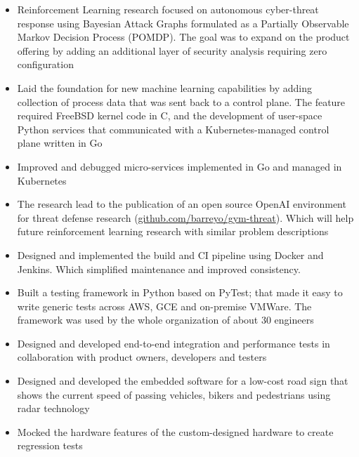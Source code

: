 \documentclass{cv_doc}
\begin{document}
\begin{itemize}[label={\tiny\raisebox{1ex}{\textbullet}}]
  \item {Reinforcement Learning research focused on autonomous cyber-threat response using Bayesian Attack Graphs formulated as a Partially Observable Markov Decision Process (POMDP). The goal was to expand on the product offering by adding an additional layer of security analysis requiring zero configuration}
  \item {Laid the foundation for new machine learning capabilities by adding collection of process data that was sent back to a control plane. The feature required FreeBSD kernel code in C, and the development of user-space Python services that communicated with a Kubernetes-managed control plane written in Go}
  \item {Improved and debugged micro-services implemented in Go and managed in Kubernetes}
  \item {The research lead to the publication of an open source OpenAI environment for threat defense research
  (\href{https://github.com/barreyo/gym-threat}{github.com/barreyo/gym-threat}}). Which will help future reinforcement learning research with similar problem descriptions
\end{itemize}


\begin{itemize}[label={\tiny\raisebox{1ex}{\textbullet}}]
  \item {Designed and implemented the build and CI pipeline using Docker and Jenkins. Which simplified maintenance and improved consistency.}
  \item {Built a testing framework in Python based on PyTest; that made it easy
  to write generic tests across AWS, GCE and on-premise VMWare. The framework
  was used by the whole organization of about 30 engineers}
  \item {Designed and developed end-to-end integration and performance tests in collaboration with product owners, developers and testers}
\end{itemize}


\begin{itemize}[label={\tiny\raisebox{1ex}{\textbullet}}]
  \item {Designed and developed the embedded software for a low-cost road sign
  that shows the current speed of passing vehicles, bikers and pedestrians
  using radar technology}
  \item {Mocked the hardware features of the custom-designed hardware to create
  regression tests}
\end{itemize}
\end{document}
